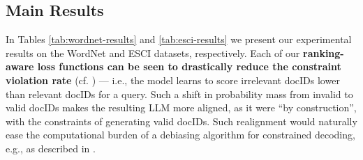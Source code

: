\documentclass[11pt, a4paper, onecolumn, confidential, copyright, gdm]{google}
\begin{document}
\begin{table}[ht]
\vspace{0.5cm} %

\caption{ESCI results (evaluated over 310 (query, targets)-examples)}
\label{tab:esci-results}

\end{table}

\subsection{Main Results}

In Tables \ref{tab:wordnet-results} and \ref{tab:esci-results} we present our experimental results on the WordNet and ESCI datasets, respectively. Each of our \textbf{ranking-aware loss functions can be seen to drastically reduce the constraint violation rate} (cf. ) — i.e., the model learns to score irrelevant docIDs lower than relevant docIDs for a query. Such a shift in probability mass from invalid to valid docIDs makes the resulting LLM more aligned, as it were ``by construction'', with the constraints of generating valid docIDs. Such realignment would naturally ease the computational burden of a debiasing algorithm for constrained decoding, e.g., as described in \citet{ye2025efficient}.
\end{document}
